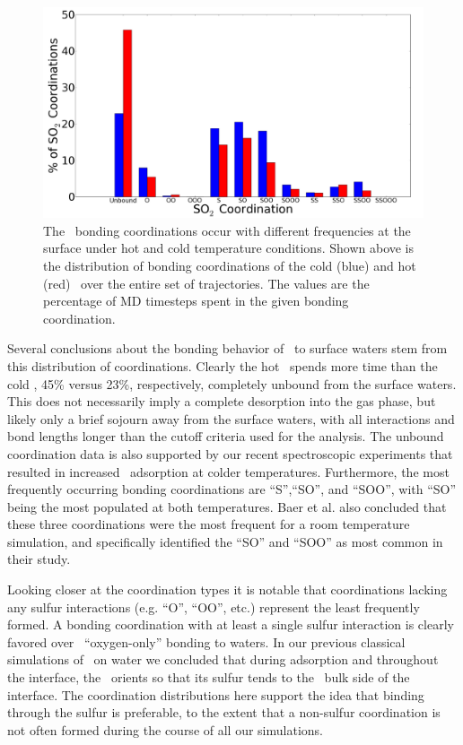 \documentclass{article}
\begin{document}
\begin{figure}[h!]
	\begin{center}
		\includegraphics[scale=1.0]{coordination-distributions.png}
		\caption{The \suldiox~bonding coordinations occur with different frequencies at the surface under hot and cold temperature conditions. Shown above is the distribution of bonding coordinations of the cold (blue) and hot (red) \suldiox~over the entire set of trajectories. The values are the percentage of MD timesteps spent in the given bonding coordination.}
		\label{fig:bonding-coordinations}
	\end{center}
\end{figure}

	Several conclusions about the bonding behavior of \suldiox~to surface waters stem from this distribution of coordinations. Clearly the hot \suldiox~spends more time than the cold \suldiox, 45\% versus 23\%, respectively, completely unbound from the surface waters. This does not necessarily imply a complete desorption into the gas phase, but likely only a brief sojourn away from the surface waters, with all interactions and bond lengths longer than the cutoff criteria used for the analysis. The unbound coordination data is also supported by our recent spectroscopic experiments that resulted in increased \suldiox~adsorption at colder temperatures.\cite{Ota2011} Furthermore, the most frequently occurring bonding coordinations are ``S'',``SO'', and ``SOO'', with ``SO'' being the most populated at both temperatures. Baer et al. also concluded that these three coordinations were the most frequent for a room temperature simulation, and specifically identified the ``SO'' and ``SOO'' as most common in their study.\cite{Baer2010}

	Looking closer at the coordination types it is notable that coordinations lacking any sulfur interactions (e.g. ``O'', ``OO'', etc.) represent the least frequently formed. A bonding coordination with at least a single sulfur interaction is clearly favored over \suldiox~``oxygen-only'' bonding to waters. In our previous classical simulations of \suldiox~on water we concluded that during adsorption and throughout the interface, the \suldiox~orients so that its sulfur tends to the \wat~bulk side of the interface.\cite{Shamay2011} The coordination distributions here support the idea that binding through the sulfur is preferable, to the extent that a non-sulfur coordination is not often formed during the course of all our simulations.
\end{document}

